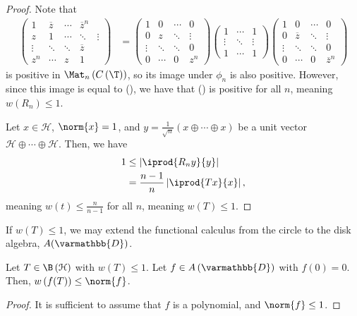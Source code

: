 \documentclass[10pt]{mypackage}
\renewcommand*{\mathbb}[1]{\varmathbb{#1}}
\begin{document}
\begin{proof}
  Note that
  \begin{align*}
    \begin{pmatrix}1 & \overline{z} & \cdots & \overline{z}^n \\ z & 1 & \cdots & \ddots & \vdots \\ \vdots & \ddots & \ddots & \overline{z} \\ z^n & \cdots & z & 1\end{pmatrix} &= \begin{pmatrix}1 & 0 & \cdots & 0 \\ 0 & z & \ddots & \vdots \\ \vdots & \ddots & \ddots & 0 \\ 0 & \cdots & 0 & z^n\end{pmatrix} \begin{pmatrix}1 & \cdots & 1 \\ \vdots & \ddots & \vdots \\ 1 & \cdots & 1\end{pmatrix} \begin{pmatrix}1 & 0 & \cdots & 0 \\ 0 & \overline{z} & \ddots & \vdots \\ \vdots & \ddots & \ddots & 0 \\ 0 & \cdots & 0 & \overline{z}^n \end{pmatrix}
  \end{align*}
  is positive in $\Mat_n\left( C\left( \T \right) \right)$, so its image under $\phi_n$ is also positive. However, since this image is equal to (\textasteriskcentered), we have that (\textasteriskcentered) is positive for all $n$, meaning $w\left( R_n \right)\leq 1$.\newline

  Let $x\in \mathcal{H}$, $\norm{x} = 1$, and $y = \frac{1}{\sqrt{n}}\left( x\oplus\cdots\oplus x \right)$ be a unit vector $\mathcal{H}\oplus\cdots\oplus \mathcal{H}$.  Then, we have
  \begin{align*}
    1 &\leq \left\vert \iprod{R_ny}{y} \right\vert\\
      &= \frac{n-1}{n}\left\vert \iprod{Tx}{x} \right\vert,
  \end{align*}
  meaning $w(t)\leq \frac{n}{n-1}$ for all $n$, meaning $w(T)\leq 1$.
\end{proof}
If $w(T)\leq 1$, we may extend the functional calculus from the circle to the disk algebra, $A(\mathbb{D})$.
\begin{corollary}
  Let $T\in \B\left( \mathcal{H} \right)$ with $w(T)\leq 1$. Let $f\in A\left( \mathbb{D} \right)$ with $f(0) = 0$. Then, $w\left( f(T) \right)\leq \norm{f}$.
\end{corollary}
\begin{proof}
  It is sufficient to assume that $f$ is a polynomial, and $\norm{f}\leq 1$. 
\end{proof}
\end{document}
